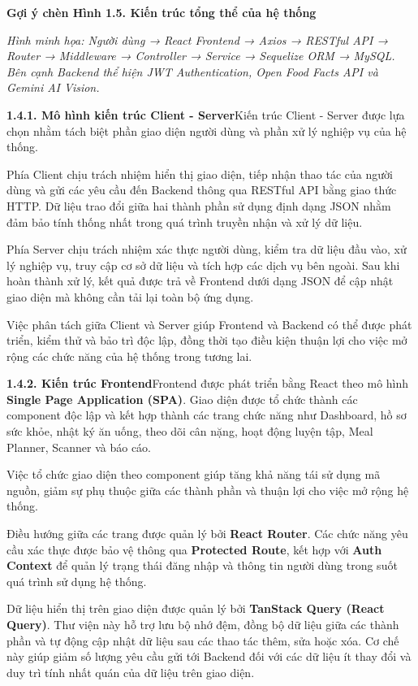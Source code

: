 \textbf{Gợi ý chèn Hình 1.5. Kiến trúc tổng thể của hệ thống}

\textit{Hình minh họa: Người dùng → React Frontend → Axios → RESTful API → Router → Middleware → Controller → Service → Sequelize ORM → MySQL. Bên cạnh Backend thể hiện JWT Authentication, Open Food Facts API và Gemini AI Vision.}

\textbf{1.4.1. Mô hình kiến trúc Client - Server}Kiến trúc Client - Server được lựa chọn nhằm tách biệt phần giao diện người dùng và phần xử lý nghiệp vụ của hệ thống.

Phía Client chịu trách nhiệm hiển thị giao diện, tiếp nhận thao tác của người dùng và gửi các yêu cầu đến Backend thông qua RESTful API bằng giao thức HTTP. Dữ liệu trao đổi giữa hai thành phần sử dụng định dạng JSON nhằm đảm bảo tính thống nhất trong quá trình truyền nhận và xử lý dữ liệu.

Phía Server chịu trách nhiệm xác thực người dùng, kiểm tra dữ liệu đầu vào, xử lý nghiệp vụ, truy cập cơ sở dữ liệu và tích hợp các dịch vụ bên ngoài. Sau khi hoàn thành xử lý, kết quả được trả về Frontend dưới dạng JSON để cập nhật giao diện mà không cần tải lại toàn bộ ứng dụng.

Việc phân tách giữa Client và Server giúp Frontend và Backend có thể được phát triển, kiểm thử và bảo trì độc lập, đồng thời tạo điều kiện thuận lợi cho việc mở rộng các chức năng của hệ thống trong tương lai.

\textbf{1.4.2. Kiến trúc Frontend}Frontend được phát triển bằng React theo mô hình \textbf{Single Page Application (SPA)}. Giao diện được tổ chức thành các component độc lập và kết hợp thành các trang chức năng như Dashboard, hồ sơ sức khỏe, nhật ký ăn uống, theo dõi cân nặng, hoạt động luyện tập, Meal Planner, Scanner và báo cáo.

Việc tổ chức giao diện theo component giúp tăng khả năng tái sử dụng mã nguồn, giảm sự phụ thuộc giữa các thành phần và thuận lợi cho việc mở rộng hệ thống.

Điều hướng giữa các trang được quản lý bởi \textbf{React Router}. Các chức năng yêu cầu xác thực được bảo vệ thông qua \textbf{Protected Route}, kết hợp với \textbf{Auth Context} để quản lý trạng thái đăng nhập và thông tin người dùng trong suốt quá trình sử dụng hệ thống.

Dữ liệu hiển thị trên giao diện được quản lý bởi \textbf{TanStack Query (React Query)}. Thư viện này hỗ trợ lưu bộ nhớ đệm, đồng bộ dữ liệu giữa các thành phần và tự động cập nhật dữ liệu sau các thao tác thêm, sửa hoặc xóa. Cơ chế này giúp giảm số lượng yêu cầu gửi tới Backend đối với các dữ liệu ít thay đổi và duy trì tính nhất quán của dữ liệu trên giao diện.

